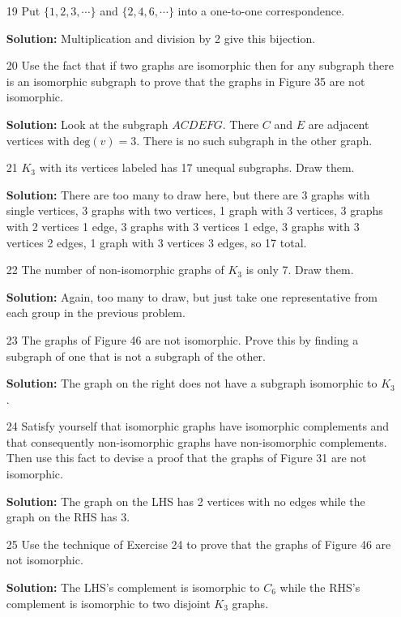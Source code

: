 \documentclass{article}
\begin{document}
\begin{enumerate}
\item[19] Put $\{1, 2, 3, \cdots\}$ and $\{2, 4, 6, \cdots\}$ into a one-to-one correspondence.

\textbf{Solution:} Multiplication and division by 2 give this bijection.

\item[20] Use the fact that if two graphs are isomorphic then for any subgraph there is an isomorphic subgraph to prove that the graphs in Figure 35 are not isomorphic.

\textbf{Solution:} Look at the subgraph $ACDEFG$. There $C$ and $E$ are adjacent vertices with $\mathrm{deg}(v) = 3$. There is no such subgraph in the other graph.

\item[21] $K_3$ with its vertices labeled has 17 unequal subgraphs. Draw them.

\textbf{Solution:} There are too many to draw here, but there are 3 graphs with single vertices, 3 graphs with two vertices, 1 graph with 3 vertices, 3 graphs with 2 vertices 1 edge, 3 graphs with 3 vertices 1 edge, 3 graphs with 3 vertices 2 edges, 1 graph with 3 vertices 3 edges, so 17 total.

\item[22] The number of non-isomorphic graphs of $K_3$ is only 7. Draw them.

\textbf{Solution:} Again, too many to draw, but just take one representative from each group in the previous problem.

\item[23] The graphs of Figure 46 are not isomorphic. Prove this by finding a subgraph of one that is not a subgraph of the other.

\textbf{Solution:} The graph on the right does not have a subgraph isomorphic to $K_3$.

\item[24] Satisfy yourself that isomorphic graphs have isomorphic complements and that consequently non-isomorphic graphs have non-isomorphic complements. Then use this fact to devise a proof that the graphs of Figure 31 are not isomorphic.

\textbf{Solution:} The graph on the LHS has 2 vertices with no edges while the graph on the RHS has 3.

\item[25] Use the technique of Exercise 24 to prove that the graphs of Figure 46 are not isomorphic.

\textbf{Solution:} The LHS's complement is isomorphic to $C_6$ while the RHS's complement is isomorphic to two disjoint $K_3$ graphs.


\end{enumerate}
\end{document}
